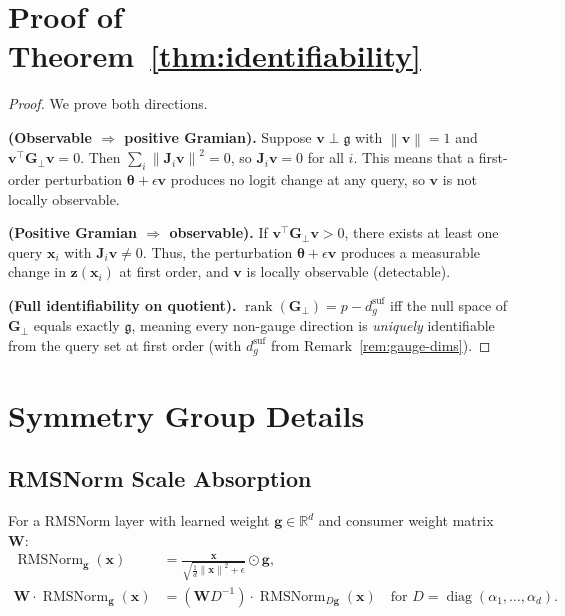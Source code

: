 \documentclass{article}
\newcommand{\R}{\mathbb{R}}
\newcommand{\btheta}{\boldsymbol{\theta}}
\newcommand{\bz}{\mathbf{z}}
\newcommand{\bx}{\mathbf{x}}
\newcommand{\bW}{\mathbf{W}}
\newcommand{\bJ}{\mathbf{J}}
\newcommand{\bG}{\mathbf{G}}
\newcommand{\norm}[1]{\left\lVert #1 \right\rVert}
\DeclareMathOperator{\diag}{diag}
\DeclareMathOperator{\rank}{rank}
\DeclareMathOperator{\RMSNorm}{RMSNorm}
\begin{document}
\section{Proof of Theorem~\ref{thm:identifiability}}
\label{app:proof}

\begin{proof}
We prove both directions.

\textbf{(Observable $\Rightarrow$ positive Gramian).} Suppose $\mathbf{v} \perp \mathfrak{g}$ with $\norm{\mathbf{v}} = 1$ and $\mathbf{v}^\top \bG_\perp \mathbf{v} = 0$. Then $\sum_i \norm{\bJ_i \mathbf{v}}^2 = 0$, so $\bJ_i \mathbf{v} = 0$ for all $i$. This means that a first-order perturbation $\btheta + \epsilon \mathbf{v}$ produces no logit change at any query, so $\mathbf{v}$ is not locally observable.

\textbf{(Positive Gramian $\Rightarrow$ observable).} If $\mathbf{v}^\top \bG_\perp \mathbf{v} > 0$, there exists at least one query $\bx_i$ with $\bJ_i \mathbf{v} \neq 0$. Thus, the perturbation $\btheta + \epsilon \mathbf{v}$ produces a measurable change in $\bz(\bx_i)$ at first order, and $\mathbf{v}$ is locally observable (detectable).

\textbf{(Full identifiability on quotient).} $\rank(\bG_\perp) = p - d_g^{\text{suf}}$ iff the null space of $\bG_\perp$ equals exactly $\mathfrak{g}$, meaning every non-gauge direction is \emph{uniquely} identifiable from the query set at first order (with $d_g^{\text{suf}}$ from Remark~\ref{rem:gauge-dims}).
\end{proof}

\section{Symmetry Group Details}
\label{app:symmetry}

\subsection{RMSNorm Scale Absorption}

For a RMSNorm layer with learned weight $\mathbf{g} \in \R^d$ and consumer weight matrix $\bW$:
\begin{align}
    \RMSNorm_{\mathbf{g}}(\bx) &= \frac{\bx}{\sqrt{\frac{1}{d}\norm{\bx}^2 + \epsilon}} \odot \mathbf{g}, \\
    \bW \cdot \RMSNorm_{\mathbf{g}}(\bx) &= (\bW D^{-1}) \cdot \RMSNorm_{D\mathbf{g}}(\bx) \quad \text{for } D = \diag(\alpha_1, \ldots, \alpha_d).
\end{align}
\end{document}
